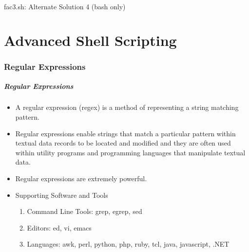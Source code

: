 \documentclass[10pt,t]{beamer}
\begin{document}
\begin{frame}[fragile]%
  \vspace{-0.3cm}
  \begin{exampleblock}{fac3.sh: Alternate Solution 4 (bash only)}
    
  \end{exampleblock}
\end{frame}

\part[Day 2]{Advanced Shell Scripting}
\section{Regular Expressions}
\begin{frame}[c]
  \frametitle{Regular Expressions}
  \begin{itemize}
    \item A regular expression (regex) is a method of representing a string matching pattern. 
    \item Regular expressions enable strings that match a particular pattern within textual data records to be located and modified and they are often used within utility programs and programming languages that manipulate textual data. 
    \item Regular expressions are extremely powerful.
    \item Supporting Software and Tools
    \begin{enumerate}
        \item Command Line Tools: grep, egrep, sed
        \item Editors: ed, vi, emacs
        \item Languages: awk, perl, python, php, ruby, tcl, java, javascript, .NET
    \end{enumerate}
  \end{itemize}
\end{frame}
\end{document}
